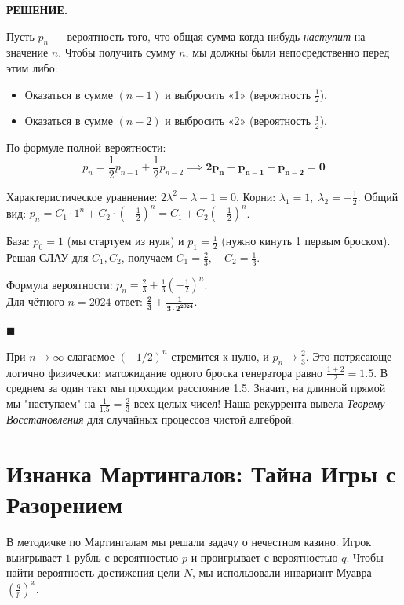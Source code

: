 \documentclass[12pt,a4paper]{article}
\newenvironment{solution}{
    \begin{tcolorbox}[
        enhanced, breakable, blanker,
        borderline west={2.5pt}{0pt}{solgray},
        left=12pt, top=5pt, bottom=5pt,
        before skip=10pt, after skip=15pt
    ]
    \textbf{\textsf{РЕШЕНИЕ.}}\;
}{
    \hfill $\blacksquare$
    \end{tcolorbox}
}
\begin{document}
\begin{solution}
Пусть $p_n$ — вероятность того, что общая сумма когда-нибудь \textit{наступит} на значение $n$.
Чтобы получить сумму $n$, мы должны были непосредственно перед этим либо:
\begin{itemize}
    \item Оказаться в сумме $(n-1)$ и выбросить «1» (вероятность $\frac{1}{2}$).
    \item Оказаться в сумме $(n-2)$ и выбросить «2» (вероятность $\frac{1}{2}$).
\end{itemize}
По формуле полной вероятности:
\[ p_n = \frac{1}{2}p_{n-1} + \frac{1}{2}p_{n-2} \implies \mathbf{2p_n - p_{n-1} - p_{n-2} = 0} \]

Характеристическое уравнение: $2\lambda^2 - \lambda - 1 = 0$. Корни: $\lambda_1 = 1, \; \lambda_2 = -\frac{1}{2}$.
Общий вид: $p_n = C_1 \cdot 1^n + C_2 \cdot \left(-\frac{1}{2}\right)^n = C_1 + C_2 \left(-\frac{1}{2}\right)^n$.

База: $p_0 = 1$ (мы стартуем из нуля) и $p_1 = \frac{1}{2}$ (нужно кинуть 1 первым броском).
Решая СЛАУ для $C_1, C_2$, получаем $C_1 = \frac{2}{3}, \quad C_2 = \frac{1}{3}$.

Формула вероятности: $p_n = \frac{2}{3} + \frac{1}{3} \left(-\frac{1}{2}\right)^n$. \\
Для чётного $n=2024$ ответ: $\mathbf{\frac{2}{3} + \frac{1}{3 \cdot 2^{2024}}}$.
\end{solution}

\begin{insight}
При $n \to \infty$ слагаемое $(-1/2)^n$ стремится к нулю, и $p_n \to \frac{2}{3}$. Это потрясающе логично физически: матожидание одного броска генератора равно $\frac{1+2}{2} = 1.5$. В среднем за один такт мы проходим расстояние 1.5. Значит, на длинной прямой мы "наступаем" на $\frac{1}{1.5} = \frac{2}{3}$ всех целых чисел! Наша рекуррента вывела \textit{Теорему Восстановления} для случайных процессов чистой алгеброй.
\end{insight}

\newpage
\section{Изнанка Мартингалов: Тайна Игры с Разорением}

В методичке по Мартингалам мы решали задачу о нечестном казино. Игрок выигрывает $1$ рубль с вероятностью $p$ и проигрывает с вероятностью $q$. Чтобы найти вероятность достижения цели $N$, мы использовали инвариант Муавра $\left(\frac{q}{p}\right)^x$. 
\end{document}
